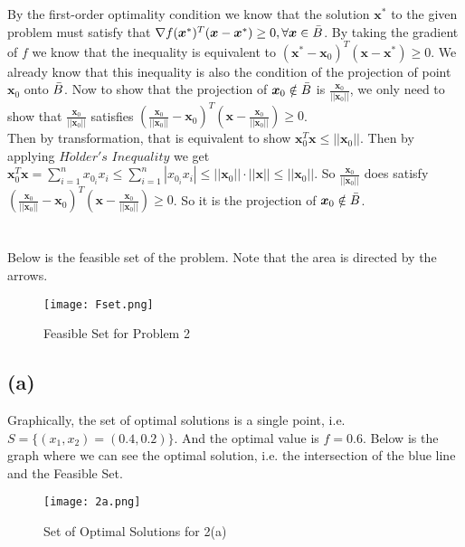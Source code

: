 \documentclass[12pt,letterpaper]{article}
\begin{document}
\section{}
By the first-order optimality condition we know that the solution $\boldsymbol{x}^*$ to the given problem must satisfy that $\nabla f(\boldsymbol{x}^*)^T(\boldsymbol{x}-\boldsymbol{x}^*)\geq0,\forall\boldsymbol{x}\in\Bar{B}$. By taking the gradient of $f$ we know that the inequality is equivalent to $(\boldsymbol{x}^*-\boldsymbol{x}_0)^T(\boldsymbol{x}-\boldsymbol{x}^*)\geq0$. We already know that this inequality is also the condition of the projection of point $\boldsymbol{x}_0$ onto $\Bar{B}$. Now to show that the projection of $\boldsymbol{x}_0\notin\Bar{B}$ is $\frac{\boldsymbol{x}_0}{||\boldsymbol{x}_0||}$, we only need to show that $\frac{\boldsymbol{x}_0}{||\boldsymbol{x}_0||}$ satisfies $(\frac{\boldsymbol{x}_0}{||\boldsymbol{x}_0||}-\boldsymbol{x}_0)^T(\boldsymbol{x}-\frac{\boldsymbol{x}_0}{||\boldsymbol{x}_0||})\geq0$.\\
Then by transformation, that is equivalent to show $\boldsymbol{x}_0^T\boldsymbol{x}\leq||\boldsymbol{x}_0||$. Then by applying $H\ddot{o}lder's$ $Inequality$ we get 
$\boldsymbol{x}_0^T\boldsymbol{x}=\sum_{i=1}^{n}x_{0_{i}}x_i\leq\sum_{i=1}^{n}|x_{0_{i}}x_i|\leq||\boldsymbol{x}_0||\cdot||\boldsymbol{x}||\leq||\boldsymbol{x}_0||$. So $\frac{\boldsymbol{x}_0}{||\boldsymbol{x}_0||}$ does satisfy $(\frac{\boldsymbol{x}_0}{||\boldsymbol{x}_0||}-\boldsymbol{x}_0)^T(\boldsymbol{x}-\frac{\boldsymbol{x}_0}{||\boldsymbol{x}_0||})\geq0$. So it is the projection of $\boldsymbol{x}_0\notin\Bar{B}$.

\section{}
Below is the feasible set of the problem. Note that the area is directed by the arrows.
\begin{figure}[htbp]
    \centering
    \texttt{[image: Fset.png]}
    \caption{\label{fig:fset} Feasible Set for Problem 2}
\end{figure}
\subsection*{(a)}
Graphically, the set of optimal solutions is a single point, i.e. $S=\{(x_1,x_2)=(0.4,0.2)\}$. And the optimal value is $f=0.6$. Below is the graph where we can see the optimal solution, i.e. the intersection of the blue line and the Feasible Set.
\begin{figure}[htbp]
    \centering
    \texttt{[image: 2a.png]}
    \caption{Set of Optimal Solutions for 2(a)}
\end{figure}
\end{document}
